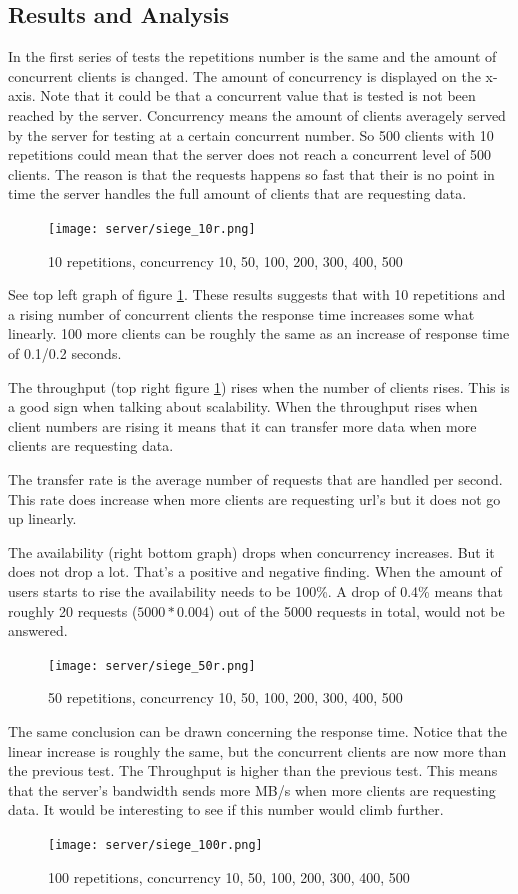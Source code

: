 \subsection{Results and Analysis}
In the first series of tests the repetitions number is the same and the amount of concurrent clients is changed. The amount of concurrency is displayed on the x-axis. Note that it could be that a concurrent value that is tested is not been reached by the server. Concurrency means the amount of clients averagely served by the server for testing at a certain concurrent number. So 500 clients with 10 repetitions could mean that the server does not reach a concurrent level of 500 clients. The reason is that the requests happens so fast that their is no point in time the server handles the full amount of clients that are requesting data.
\begin{figure}[H]
\center
\texttt{[image: server/siege\_10r.png]}
\caption{10 repetitions, concurrency 10, 50, 100, 200, 300, 400, 500}
\label{fig:10r}
\end{figure}
See top left graph of figure \ref{fig:10r}. These results suggests that with 10 repetitions and a rising number of concurrent clients the response time increases some what linearly.  100 more clients can be roughly the same as an increase of response time of 0.1/0.2 seconds. 

The throughput (top right figure \ref{fig:10r}) rises when the number of clients rises. This is a good sign when talking about scalability. When the throughput rises when client numbers are rising it means that it can transfer more data when more clients are requesting data. 

The transfer rate is the average number of requests that are handled per second. This rate does increase when more clients are requesting url's but it does not go up linearly.

The availability (right bottom graph) drops when concurrency increases. But it does not drop a lot. That's a positive and negative finding. When the amount of users starts to rise the availability needs to be 100\%. A drop of 0.4\% means that roughly 20 requests ($5000 * 0.004$) out of the 5000 requests in total, would not be answered. 

\vspace{0.5cm}
\begin{figure}[H]
\center
\texttt{[image: server/siege\_50r.png]}
\caption{50 repetitions, concurrency 10, 50, 100, 200, 300, 400, 500}
\end{figure}
The same conclusion can be drawn concerning the response time. Notice that the linear increase is roughly the same, but the concurrent clients are now more than the previous test.
The Throughput is higher than the previous test. This means that the server's bandwidth sends more MB/s when more clients are requesting data. It would be interesting to see if this number would climb further.
\begin{figure}[H]
\center
\texttt{[image: server/siege\_100r.png]}
\caption{100 repetitions, concurrency 10, 50, 100, 200, 300, 400, 500}
\end{figure}

